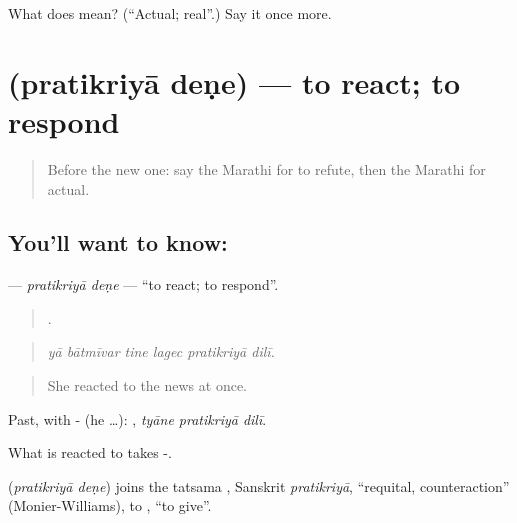 \begin{tcolorbox}[breakable,colback=teal!4,colframe=teal!35!black,title={Before you move on}]
What does  mean? (\textquotedblleft{}Actual; real\textquotedblright{}.) Say it once more.
\end{tcolorbox}
\section[\texorpdfstring{\mr{प्रतिक्रिया} \mr{देणे} (pratikriyā deṇe)}{प्रतिक्रिया देणे (pratikriyā deṇe)}]{  (pratikriyā deṇe) — to react; to respond}

\label{lesson:MR-C353-pratikriya-dene}



\begin{quote}
Before the new one: say the Marathi for to refute, then the Marathi for actual.
\end{quote}

\subsection*{You'll want to know:  }
\textbf{ } — \emph{pratikriyā deṇe} — \textquotedblleft{}to react; to respond\textquotedblright{}.

\begin{quote}
     .
\end{quote}

\begin{quote}
\emph{yā bātmīvar tine lagec pratikriyā dilī.}
\end{quote}

\begin{quote}
She reacted to the news at once.
\end{quote}

Past, with - (he …):   , \emph{tyāne pratikriyā dilī}.

What is reacted to takes -.

\begin{cousinweb}
\textbf{ } (\emph{pratikriyā deṇe}) joins the tatsama , Sanskrit \emph{pratikriyā}, \textquotedblleft{}requital, counteraction\textquotedblright{} (Monier-Williams), to , \textquotedblleft{}to give\textquotedblright{}.
\end{cousinweb}

